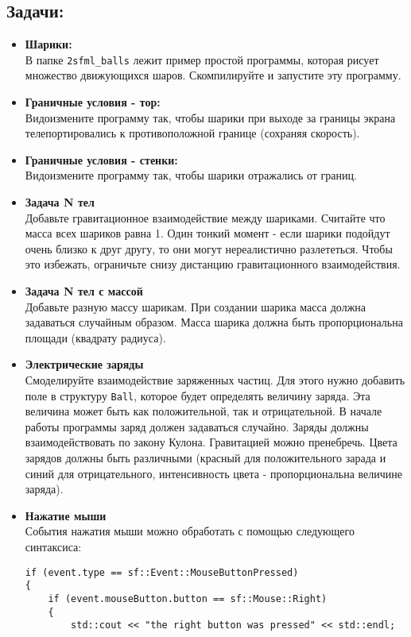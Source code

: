 \documentclass{article}
\begin{document}
\subsection*{Задачи:}
\begin{itemize}
\item \textbf{Шарики:} \\
В папке \texttt{2sfml\_balls} лежит пример простой программы, которая рисует множество движующихся шаров. Скомпилируйте и запустите эту программу.
\item \textbf{Граничные условия - тор:} \\
Видоизмените программу так, чтобы шарики при выходе за границы экрана телепортировались к противоположной границе (сохраняя скорость).
\item \textbf{Граничные условия - стенки:} \\
Видоизмените программу так, чтобы шарики отражались от границ.
\item \textbf{Задача N тел} \\
Добавьте гравитационное взаимодействие между шариками. Считайте что масса всех шариков равна 1. Один тонкий момент - если шарики подойдут очень близко к друг другу, то они могут нереалистично разлететься. Чтобы это избежать, ограничьте снизу дистанцию гравитационного взаимодействия.
\item \textbf{Задача N тел с массой} \\
Добавьте разную массу шарикам. При создании шарика масса должна задаваться случайным образом. Масса шарика должна быть пропорциональна площади (квадрату радиуса).
\item \textbf{Электрические заряды} \\
Смоделируйте взаимодействие заряженных частиц. Для этого нужно добавить поле в структуру \texttt{Ball}, которое будет определять величину заряда. Эта величина может быть как положительной, так и отрицательной. В начале работы программы заряд должен задаваться случайно. Заряды должны взаимодействовать по закону Кулона. Гравитацией можно пренебречь. Цвета зарядов должны быть различными (красный для положительного зарада и синий для отрицательного, интенсивность цвета - пропорциональна величине заряда).
\item \textbf{Нажатие мыши} \\
События нажатия мыши можно обработать с помощью следующего синтаксиса:
\begin{lstlisting}
if (event.type == sf::Event::MouseButtonPressed) 
{
    if (event.mouseButton.button == sf::Mouse::Right) 
    {
        std::cout << "the right button was pressed" << std::endl;

\end{lstlisting}
\end{itemize}
\end{document}

